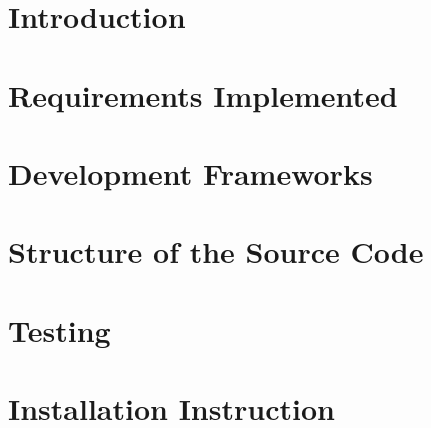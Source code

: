 \documentclass{article}
\begin{document}
\newpage

\tableofcontents

\newpage

\section{Introduction}


\newpage

\section{Requirements Implemented}


\newpage

\section{Development Frameworks}



\newpage

\section{Structure of the Source Code}

\newpage

\section{Testing}

\newpage

\section{Installation Instruction}

\end{document}
